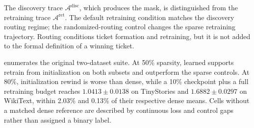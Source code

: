 \documentclass{article}
\begin{document}
The discovery trace $\mathcal{A}^{\mathrm{disc}}$, which produces the mask, is
distinguished from the retraining trace $\mathcal{A}^{\mathrm{ret}}$. The
default retraining condition matches the discovery routing regime; the
randomized-routing control changes the sparse retraining trajectory. Routing
conditions ticket formation and retraining, but it is not added to the formal
definition of a winning ticket.

 enumerates the original two-dataset suite. At
50\% sparsity, learned supports retrain from initialization on both subsets and
outperform the sparse controls. At 80\%, initialization rewind is worse than
dense, while a 10\% checkpoint plus a full retraining budget reaches
$1.0413\pm0.0138$ on TinyStories and $1.6882\pm0.0297$ on WikiText, within
2.03\% and 0.13\% of their respective dense means. Cells without a matched
dense reference are described by continuous loss and control gaps rather than
assigned a binary label.
\end{document}

